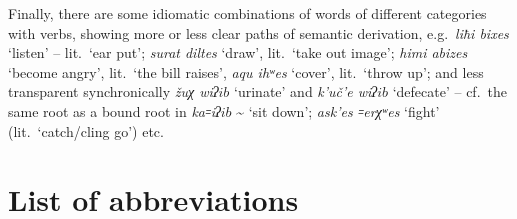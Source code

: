 \documentclass[output=paper]{langsci/langscibook}
\begin{document}
Finally, there are some idiomatic combinations of words of different
categories with verbs, showing more or less clear paths of semantic
derivation, e.g.\ \emph{liħi bixes} `listen' – lit.\ `ear put';
\emph{surat diltes} `draw', lit.\ `take out image'; \emph{himi abizes}
`become angry', lit.\ `the bill raises', \emph{aqu ihʷes} `cover',
lit.\ `throw up'; and less transparent synchronically \emph{žuχ wiʔ\(ib\)}
`urinate' and \emph{k'uč'e wiʔ\(ib\)} `defecate' – cf.\ the same root as a
bound root in \emph{ka꞊iʔ\(ib\)} \textasciitilde{} `sit down';
\emph{ask'es ꞊erχʷes} `fight' (lit.\ `catch/cling go') etc.
%


\section*{List of abbreviations}
\end{document}
